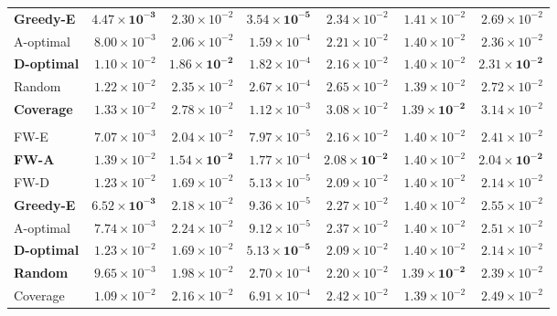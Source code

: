 \documentclass[letterpaper, 9
 pt, conference]{ieeeconf}
\begin{document}
\begin{table}[ht]
\begin{tabular}{lrrrrrr}
\textbf{Greedy-E} & $\mathbf{4.47\!\times\!10^{-3}}$ & $2.30\!\times\!10^{-2}$ & $\mathbf{3.54\!\times\!10^{-5}}$ & $2.34\!\times\!10^{-2}$ & $1.41\!\times\!10^{-2}$ & $2.69\!\times\!10^{-2}$ \\
A-optimal & $8.00\!\times\!10^{-3}$ & $2.06\!\times\!10^{-2}$ & $1.59\!\times\!10^{-4}$ & $2.21\!\times\!10^{-2}$ & $1.40\!\times\!10^{-2}$ & $2.36\!\times\!10^{-2}$ \\
\textbf{D-optimal} & $1.10\!\times\!10^{-2}$ & $\mathbf{1.86\!\times\!10^{-2}}$ & $1.82\!\times\!10^{-4}$ & $2.16\!\times\!10^{-2}$ & $1.40\!\times\!10^{-2}$ & $\mathbf{2.31\!\times\!10^{-2}}$ \\
Random & $1.22\!\times\!10^{-2}$ & $2.35\!\times\!10^{-2}$ & $2.67\!\times\!10^{-4}$ & $2.65\!\times\!10^{-2}$ & $1.39\!\times\!10^{-2}$ & $2.72\!\times\!10^{-2}$ \\
\textbf{Coverage} & $1.33\!\times\!10^{-2}$ & $2.78\!\times\!10^{-2}$ & $1.12\!\times\!10^{-3}$ & $3.08\!\times\!10^{-2}$ & $\mathbf{1.39\!\times\!10^{-2}}$ & $3.14\!\times\!10^{-2}$ \\
\addlinespace[1pt]
\multicolumn{7}{l}{\textit{$K{=}50$}} \\[1pt]
FW-E & $7.07\!\times\!10^{-3}$ & $2.04\!\times\!10^{-2}$ & $7.97\!\times\!10^{-5}$ & $2.16\!\times\!10^{-2}$ & $1.40\!\times\!10^{-2}$ & $2.41\!\times\!10^{-2}$ \\
\textbf{FW-A} & $1.39\!\times\!10^{-2}$ & $\mathbf{1.54\!\times\!10^{-2}}$ & $1.77\!\times\!10^{-4}$ & $\mathbf{2.08\!\times\!10^{-2}}$ & $1.40\!\times\!10^{-2}$ & $\mathbf{2.04\!\times\!10^{-2}}$ \\
FW-D & $1.23\!\times\!10^{-2}$ & $1.69\!\times\!10^{-2}$ & $5.13\!\times\!10^{-5}$ & $2.09\!\times\!10^{-2}$ & $1.40\!\times\!10^{-2}$ & $2.14\!\times\!10^{-2}$ \\
\textbf{Greedy-E} & $\mathbf{6.52\!\times\!10^{-3}}$ & $2.18\!\times\!10^{-2}$ & $9.36\!\times\!10^{-5}$ & $2.27\!\times\!10^{-2}$ & $1.40\!\times\!10^{-2}$ & $2.55\!\times\!10^{-2}$ \\
A-optimal & $7.74\!\times\!10^{-3}$ & $2.24\!\times\!10^{-2}$ & $9.12\!\times\!10^{-5}$ & $2.37\!\times\!10^{-2}$ & $1.40\!\times\!10^{-2}$ & $2.51\!\times\!10^{-2}$ \\
\textbf{D-optimal} & $1.23\!\times\!10^{-2}$ & $1.69\!\times\!10^{-2}$ & $\mathbf{5.13\!\times\!10^{-5}}$ & $2.09\!\times\!10^{-2}$ & $1.40\!\times\!10^{-2}$ & $2.14\!\times\!10^{-2}$ \\
\textbf{Random} & $9.65\!\times\!10^{-3}$ & $1.98\!\times\!10^{-2}$ & $2.70\!\times\!10^{-4}$ & $2.20\!\times\!10^{-2}$ & $\mathbf{1.39\!\times\!10^{-2}}$ & $2.39\!\times\!10^{-2}$ \\
Coverage & $1.09\!\times\!10^{-2}$ & $2.16\!\times\!10^{-2}$ & $6.91\!\times\!10^{-4}$ & $2.42\!\times\!10^{-2}$ & $1.39\!\times\!10^{-2}$ & $2.49\!\times\!10^{-2}$ \\
\bottomrule
\end{tabular}
\end{table}
\end{document}
